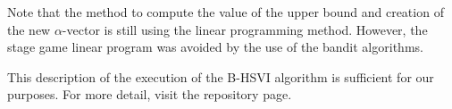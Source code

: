\documentclass[../main.tex]{subfiles}
\begin{document}
Note that the method to compute the value of the upper bound and creation of the new $\alpha$-vector is still using the linear programming method.
However, the stage game linear program was avoided by the use of the bandit algorithms.

This description of the execution of the B-HSVI algorithm is sufficient for our purposes.
For more detail, visit the repository page.
\end{document}
